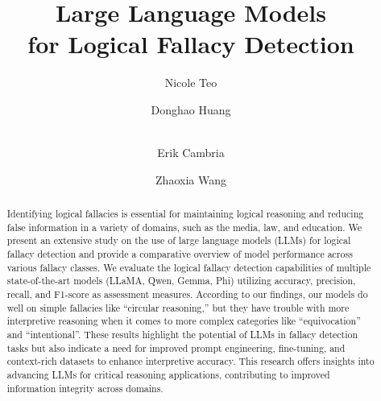 \documentclass[runningheads]{llncs}
\begin{document}
%
\title{Large Language Models \\ for Logical Fallacy Detection}
%
%

\author{Nicole Teo \and
Donghao Huang \and \\
Erik Cambria \and
Zhaoxia Wang
}



%
\maketitle              %
%
\begin{abstract}
Identifying logical fallacies is essential for maintaining logical reasoning and reducing false information in a variety of domains, such as the media, law, and education. We present an extensive study on the use of large language models (LLMs) for logical fallacy detection and provide a comparative overview of model performance across various fallacy classes. We evaluate the logical fallacy detection capabilities of multiple state-of-the-art models (LLaMA, Qwen, Gemma, Phi) utilizing accuracy, precision, recall, and F1-score as assessment measures. According to our findings, our models do well on simple fallacies like ``circular reasoning,'' but they have trouble with more interpretive reasoning when it comes to more complex categories like ``equivocation'' and ``intentional''. These results highlight the potential of LLMs in fallacy detection tasks but also indicate a need for improved prompt engineering, fine-tuning, and context-rich datasets to enhance interpretive accuracy. This research offers insights into advancing LLMs for critical reasoning applications, contributing to improved information integrity across domains.

\end{abstract}
%
%
%
\end{document}
